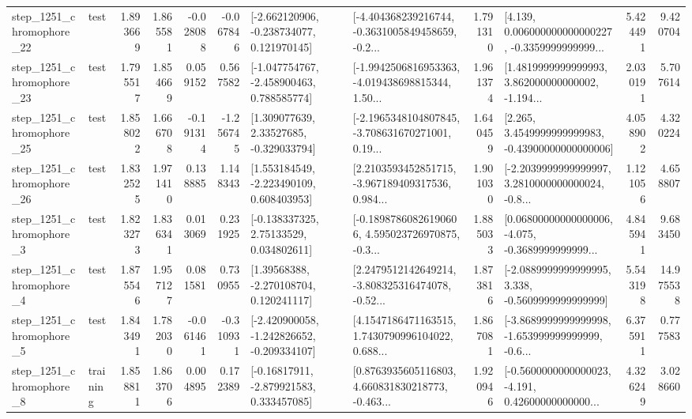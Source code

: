 \begin{tabular}{llrrrrllrlrr}
 step\_1251\_chromophore\_22 &      test &      1.893669 &    1.865581 &     -0.028088 & -0.067846 &   [-2.662120906, -0.238734077, 0.121970145] &  [-4.404368239216744, -0.3631005849458659, -0.2... &       1.791310 &  [4.139, 0.006000000000000227, -0.3359999999999... &            5.424491 &          9.420704 \\
 step\_1251\_chromophore\_23 &      test &      1.795517 &    1.854669 &      0.059152 &  0.567582 &   [-1.047754767, -2.458900463, 0.788585774] &  [-1.9942506816953363, -4.019438698815344, 1.50... &       1.961374 &  [1.4819999999999993, 3.862000000000002, -1.194... &            2.030191 &          5.707614 \\
 step\_1251\_chromophore\_25 &      test &      1.858022 &    1.666708 &     -0.191314 & -1.256745 &     [1.309077639, 2.33527685, -0.329033794] &  [-2.1965348104807845, -3.708631670271001, 0.19... &       1.640459 &  [2.265, 3.4549999999999983, -0.43900000000000006] &            4.058902 &          4.320224 \\
 step\_1251\_chromophore\_26 &      test &      1.832525 &    1.971410 &      0.138885 &  1.148343 &    [1.553184549, -2.223490109, 0.608403953] &  [2.2103593452851715, -3.967189409317536, 0.984... &       1.901030 &  [-2.2039999999999997, 3.2810000000000024, -0.8... &            1.121056 &          4.658807 \\
  step\_1251\_chromophore\_3 &      test &      1.823273 &    1.836341 &      0.013069 &  0.231925 &     [-0.138337325, 2.75133529, 0.034802611] &  [-0.18987860826190606, 4.595023726970875, -0.3... &       1.885033 &  [0.06800000000000006, -4.075, -0.3689999999999... &            4.845941 &          9.683450 \\
  step\_1251\_chromophore\_4 &      test &      1.875546 &    1.957127 &      0.081581 &  0.730955 &     [1.39568388, -2.270108704, 0.120241117] &  [2.2479512142649214, -3.808325316474078, -0.52... &       1.873816 &  [-2.0889999999999995, 3.338, -0.5609999999999999] &            5.543198 &         14.975538 \\
  step\_1251\_chromophore\_5 &      test &      1.843491 &    1.782030 &     -0.061461 & -0.310931 &  [-2.420900058, -1.242826652, -0.209334107] &  [4.1547186471163515, 1.7430790996104022, 0.688... &       1.867081 &  [-3.8689999999999998, -1.653999999999999, -0.6... &            6.375911 &          0.777583 \\
  step\_1251\_chromophore\_8 &  training &      1.858811 &    1.863706 &      0.004895 &  0.172389 &    [-0.16817911, -2.879921583, 0.333457085] &  [0.8763935605116803, 4.660831830218773, -0.463... &       1.920946 &  [-0.5600000000000023, -4.191, 0.42600000000000... &            4.326249 &          3.028660 \\

\end{tabular}

